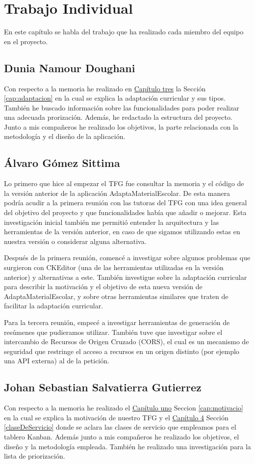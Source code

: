 \chapter{Trabajo Individual}
\label{cap:TrabajoIndividual}

En este capítulo se habla del trabajo que ha realizado cada miembro del equipo en el proyecto.

\section{Dunia Namour Doughani}
Con respecto a la memoria he realizado en {\hyperref[cap:estadoDelArte]{Capítulo tres}} la Sección \ref{cap:adaptacion} en la cual se explica la adaptación curricular y sus tipos. También he buscado información sobre las funcionalidades para poder realizar una adecuada prorización. Además, he redactado la estructura del proyecto. Junto a mis compañeros he realizado los objetivos, la parte relacionada con la metodología y el diseño de la aplicación.

\section{Álvaro Gómez Sittima}
Lo primero que hice al empezar el TFG fue consultar la memoria y el código de la versión anterior de la aplicación AdaptaMaterialEscolar. De esta manera podría acudir a la primera reunión con las tutoras del TFG con una idea general del objetivo del proyecto y que funcionalidades había que añadir o mejorar. Esta investigación inicial también me permitió entender la arquitectura y las herramientas de la versión anterior, en caso de que sigamos utilizando estas en nuestra versión o considerar alguna alternativa.

Después de la primera reunión, comencé a investigar sobre algunos problemas que surgieron con CKEditor (una de las herramientas utilizadas en la versión anterior) y alternativas a este. También investigue sobre la adaptación curricular para describir la motivación y el objetivo de esta nueva versión de AdaptaMaterialEscolar, y sobre otras herramientas similares que traten de facilitar la adaptación curricular.

Para la tercera reunión, empecé a investigar herramientas de generación de resúmenes que pudieramos utilizar. También tuve que investigar sobre el intercambio de Recursos de Origen Cruzado (CORS), el cual es un mecanismo de seguridad que restringe el acceso a recursos en un origen distinto (por ejemplo una API externa) al de la petición.

\section{Johan Sebastian Salvatierra Gutierrez}
Con respecto a la memoria he realizado el {\hyperref[cap:motivacio]{Capítulo uno}} Seccion \ref{cap:motivacio} en la cual se explica la motivación de nuestro TFG y el {\hyperref[claseDeServicio]{Capítulo 4}} Sección \ref{claseDeServicio} donde se aclara las clases de servicio que empleamos para el tablero Kanban. 
Además junto a mis compañeros he realizado los objetivos, el diseño y la metodología empleada. También he realizado una investigación para la lista de priorización.